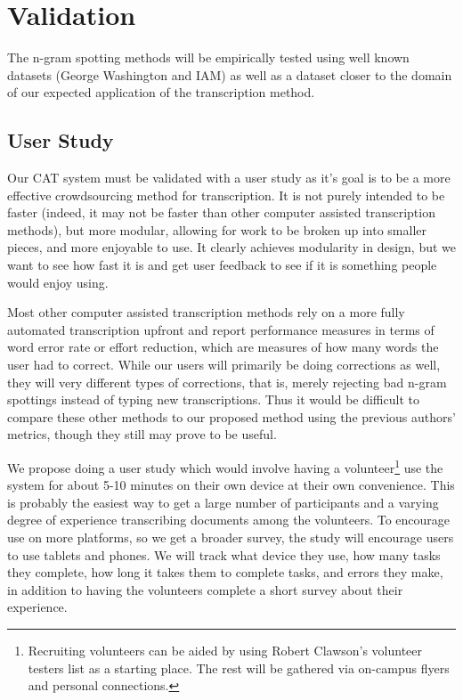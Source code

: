 \documentclass[ms]{byuprop}
\begin{document}
\section{Validation}
The n-gram spotting methods will be empirically tested using well known datasets (George Washington\cite{GW} and IAM\cite{IAM}) as well as a dataset closer to the domain of our expected application of the transcription method.

\subsection{User Study}

Our CAT system must be validated with a user study as it's goal is to be a more effective crowdsourcing method for transcription. It is not purely intended to be faster (indeed, it may not be faster than other computer assisted transcription methods), but more modular, allowing for work to be broken up into smaller pieces, and more enjoyable to use. It clearly achieves modularity in design, but we want to see how fast it is and get user feedback to see if it is something people would enjoy using.

Most other computer assisted transcription methods rely on a more fully automated transcription upfront and report performance measures in terms of word error rate or effort reduction, which are measures of how many words the user had to correct. While our users will primarily be doing corrections as well, they will very different types of corrections, that is, merely rejecting bad n-gram spottings instead of typing new transcriptions. Thus it would be difficult to compare these other methods to our proposed method using the previous authors' metrics, though they still may prove to be useful.

We propose doing a user study which would involve having a volunteer\footnote{Recruiting volunteers can be aided by using Robert Clawson's volunteer testers list as a starting place. The rest will be gathered via on-campus flyers and personal connections.} use the system for about 5-10 minutes on their own device at their own convenience. This is probably the easiest way to get a large number of participants and a varying degree of experience transcribing documents among the volunteers. To encourage use on more platforms, so we get a broader survey, the study will encourage users to use tablets and phones.
We will track what device they use, how many tasks they complete, how long it takes them to complete tasks, and errors they make, in addition to having the volunteers complete a short survey about their experience.
\end{document}
